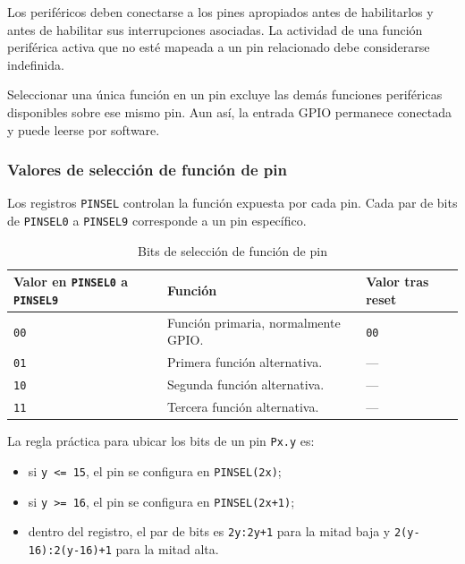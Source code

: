 Los periféricos deben conectarse a los pines apropiados antes de habilitarlos y antes de habilitar sus interrupciones asociadas. La actividad de una función periférica activa que no esté mapeada a un pin relacionado debe considerarse indefinida.

Seleccionar una única función en un pin excluye las demás funciones periféricas disponibles sobre ese mismo pin. Aun así, la entrada GPIO permanece conectada y puede leerse por software.

\subsubsection{Valores de selección de función de pin}
Los registros \texttt{PINSEL} controlan la función expuesta por cada pin. Cada par de bits de \texttt{PINSEL0} a \texttt{PINSEL9} corresponde a un pin específico.

\begin{table}[H]
  \centering
  \small
  \renewcommand{\arraystretch}{1.15}
  \caption{Bits de selección de función de pin}
  \begin{tabularx}{0.9\textwidth}{|>{\raggedright\arraybackslash}p{}|>{\raggedright\arraybackslash}X|>{\raggedright\arraybackslash}p{}|}
    \hline
    \textbf{Valor en \texttt{PINSEL0} a \texttt{PINSEL9}} & \textbf{Función} & \textbf{Valor tras reset} \\
    \hline
    \texttt{00} & Función primaria, normalmente GPIO. & \texttt{00} \\
    \hline
    \texttt{01} & Primera función alternativa. & --- \\
    \hline
    \texttt{10} & Segunda función alternativa. & --- \\
    \hline
    \texttt{11} & Tercera función alternativa. & --- \\
    \hline
  \end{tabularx}
\end{table}

La regla práctica para ubicar los bits de un pin \texttt{Px.y} es:

\begin{itemize}
  \item si \texttt{y <= 15}, el pin se configura en \texttt{PINSEL(2x)};
  \item si \texttt{y >= 16}, el pin se configura en \texttt{PINSEL(2x+1)};
  \item dentro del registro, el par de bits es \texttt{2y:2y+1} para la mitad baja y \texttt{2(y-16):2(y-16)+1} para la mitad alta.
\end{itemize}

